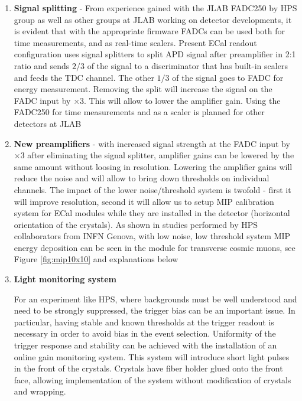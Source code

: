 \begin{enumerate}
\item {\bf Signal splitting} - From experience gained with the JLAB FADC250 by HPS group as well as other groups at JLAB working on detector developments, it is evident that with the appropriate firmware FADCs can be used both for time measurements, and as real-time scalers. Present ECal readout configuration uses signal splitters to split APD signal after preamplifier in 2:1 ratio and sends $2/3$ of the signal to a discriminator that has built-in scalers and feeds the TDC channel. The other $1/3$ of the signal goes to FADC for energy measurement. Removing the split will increase the signal on the FADC input by $\times 3$. This will allow to lower the amplifier gain. Using the FADC250 for time measurements and as a scaler is planned for other detectors at JLAB 
 
\item {\bf New preamplifiers} - with increased signal strength at the FADC input by $\times 3$ after eliminating the signal splitter, amplifier gains can be lowered by the same amount without loosing in resolution. Lowering the amplifier gains will reduce the noise and will allow to bring down thresholds on individual channels. The impact of the lower noise/threshold system is twofold - first it will improve resolution, second it will allow us to setup MIP calibration system for ECal modules while they are installed in the detector (horizontal orientation of the crystals). As shown in studies performed by HPS collaborators from INFN Genova, with low noise, low threshold system MIP energy deposition can be seen in the module for transverse cosmic muons, see Figure \ref{fig:mip10x10} and explanations below

\item {\bf Light monitoring system}

For an experiment like HPS, where backgrounds must be well understood and need to be strongly suppressed, the trigger bias can be an important issue. In particular, having stable and known thresholds at the trigger readout is necessary in order to avoid  bias in the event selection. Uniformity of the trigger response and stability can be achieved with the installation of an online gain monitoring system. This system will introduce short light pulses in the front of the crystals. Crystals have fiber holder glued onto the  front face, allowing implementation of the system without modification of crystals and wrapping. 


\end{enumerate}
